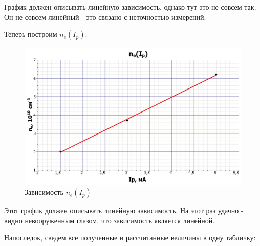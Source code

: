 \documentclass[a4paper,12pt]{article} %
\begin{document}
График должен описывать линейную зависимость, однако тут это не совсем так. Он не совсем линейный - это связано с неточностью измерений.


\newpage

Теперь построим $n_e(I_p)$:

\begin{figure}[h!]
	\centering
	\includegraphics[scale=0.6]{Pictures/n(I).jpg}
	\caption{Зависимость $n_e(I_p)$}
\end{figure}

Этот график должен описывать линейную зависимость. На этот раз удачно - видно невооруженным глазом, что зависимость является линейной.

\vspace{20mm}
Напоследок, сведем все полученные и рассчитанные величины в одну табличку:

\begin{table}[h!]
\caption{Итоговая таблица}
\end{table} 
\end{document}

